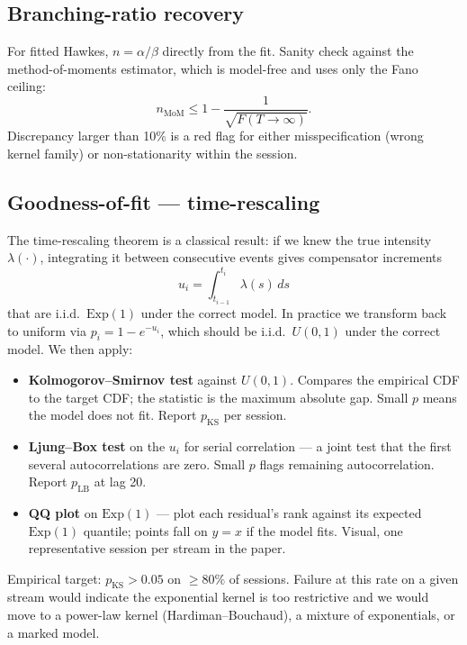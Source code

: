 \subsection{Branching-ratio recovery}
\label{app:diag-nrec}

For fitted Hawkes, $n = \alpha/\beta$ directly from the fit. Sanity check against the method-of-moments estimator, which is model-free and uses only the Fano ceiling:
$$n_{\mathrm{MoM}} \leq 1 - \frac{1}{\sqrt{F(T \to \infty)}}.$$
Discrepancy larger than 10\% is a red flag for either misspecification (wrong kernel family) or non-stationarity within the session.

\subsection{Goodness-of-fit --- time-rescaling}
\label{app:pp-gof}

The time-rescaling theorem is a classical result: if we knew the true intensity $\lambda(\cdot)$, integrating it between consecutive events gives compensator increments
$$u_i = \int_{t_{i-1}}^{t_i} \lambda(s)\, ds$$
that are i.i.d.\ $\mathrm{Exp}(1)$ under the correct model. In practice we transform back to uniform via $p_i = 1 - e^{-u_i}$, which should be i.i.d.\ $U(0, 1)$ under the correct model. We then apply:

\begin{itemize}
    \item \textbf{Kolmogorov--Smirnov test} against $U(0, 1)$. Compares the empirical CDF to the target CDF; the statistic is the maximum absolute gap. Small $p$ means the model does not fit. Report $p_{\mathrm{KS}}$ per session.
    \item \textbf{Ljung--Box test} on the $u_i$ for serial correlation --- a joint test that the first several autocorrelations are zero. Small $p$ flags remaining autocorrelation. Report $p_{\mathrm{LB}}$ at lag 20.
    \item \textbf{QQ plot} on $\mathrm{Exp}(1)$ --- plot each residual's rank against its expected $\mathrm{Exp}(1)$ quantile; points fall on $y = x$ if the model fits. Visual, one representative session per stream in the paper.
\end{itemize}

Empirical target: $p_{\mathrm{KS}} > 0.05$ on $\geq 80\%$ of sessions. Failure at this rate on a given stream would indicate the exponential kernel is too restrictive and we would move to a power-law kernel (Hardiman--Bouchaud), a mixture of exponentials, or a marked model.

